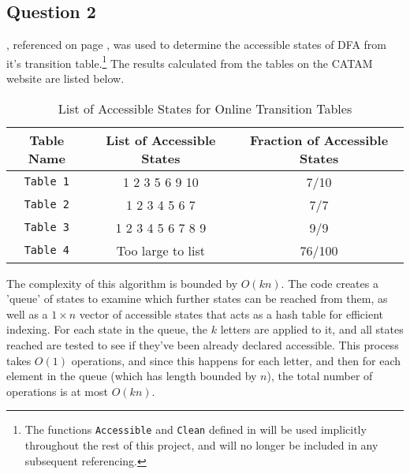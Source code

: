 \documentclass[10pt,a4paper,notitlepage]{article}
\begin{document}
\subsection*{\centering Question 2}
, referenced on page \pageref{cd:2}, was used to determine the accessible states of DFA from it's transition table.\footnote{The functions \texttt{Accessible} and \texttt{Clean} defined in  will be used implicitly throughout the rest of this project, and will no longer be included in any subsequent referencing.} The results calculated from the tables on the CATAM website are listed below.
\begin{table}[H]
\centering
\begin{tabular}{c|c|c}
Table Name & List of Accessible States & Fraction of Accessible States\\
\hline
\texttt{Table 1} &  1     2     3     5     6     9    10 & 7/10\\
\texttt{Table 2} & 1     2     3     4     5     6     7 & 7/7\\
\texttt{Table 3} & 1     2     3     4     5     6     7     8     9 & 9/9\\
\texttt{Table 4} & Too large to list & 76/100\\
\end{tabular}
\caption{List of Accessible States for Online Transition Tables}
\end{table}
The complexity of this algorithm is bounded by $O(kn)$. The code creates a 'queue' of states to examine which further states can be reached from them, as well as a $1\times n$ vector of accessible states that acts as a hash table for efficient indexing. For each state in the queue, the $k$ letters are applied to it, and all states reached are tested to see if they've been already declared accessible. This process takes $O(1)$ operations, and since this happens for each letter, and then for each element in the queue (which has length bounded by $n$), the total number of operations is at most $O(kn)$.\\
\end{document}
